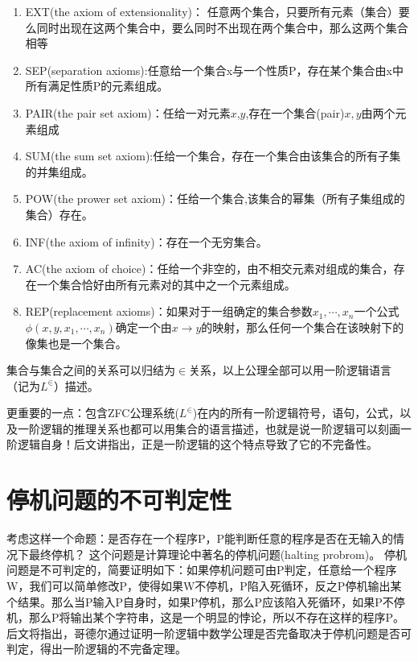     \begin{enumerate}
      \item  EXT(the axiom of extensionality)：	任意两个集合，只要所有元素（集合）要么同时出现在这两个集合中，要么同时不出现在两个集合中，那么这两个集合相等

      \item SEP(separation axioms):任意给一个集合x与一个性质P，存在某个集合由x中所有满足性质P的元素组成。


			\item  PAIR(the pair set axiom)：任给一对元素$x$,$y$,存在一个集合(pair)${x,y}$由两个元素组成

			\item  SUM(the sum set axiom):任给一个集合，存在一个集合由该集合的所有子集的并集组成。

			\item  POW(the prower set axiom)：任给一个集合,该集合的幂集（所有子集组成的集合）存在。

			\item  INF(the axiom of infinity)：存在一个无穷集合。

			\item  AC(the axiom of choice)：任给一个非空的，由不相交元素对组成的集合，存在一个集合恰好由所有元素对的其中之一个元素组成。
			\item REP(replacement axioms)：如果对于一组确定的集合参数$x_1,\cdots,x_n$一个公式$\phi(x,y,x_1,\cdots,x_n)$确定一个由$x\rightarrow y$的映射，那么任何一个集合在该映射下的像集也是一个集合。
    \end{enumerate}
    集合与集合之间的关系可以归结为$\in$关系，以上公理全部可以用一阶逻辑语言（记为$L^{\in}$）描述。


    更重要的一点：包含ZFC公理系统($L^{\in}$)在内的所有一阶逻辑符号，语句，公式，以及一阶逻辑的推理关系也都可以用集合的语言描述，也就是说一阶逻辑可以刻画一阶逻辑自身！后文讲指出，正是一阶逻辑的这个特点导致了它的不完备性。


\section{停机问题的不可判定性}

     考虑这样一个命题：是否存在一个程序P，P能判断任意的程序是否在无输入的情况下最终停机？
		 这个问题是计算理论中著名的停机问题(halting probrom)。
		 停机问题是不可判定的，简要证明如下：如果停机问题可由P判定，任意给一个程序W，我们可以简单修改P，使得如果W不停机，P陷入死循环，反之P停机输出某个结果。那么当P输入P自身时，如果P停机，那么P应该陷入死循环，如果P不停机，那么P将输出某个字符串，这是一个明显的悖论，所以不存在这样的程序P。
     后文将指出，哥德尔通过证明一阶逻辑中数学公理是否完备取决于停机问题是否可判定，得出一阶逻辑的不完备定理。


